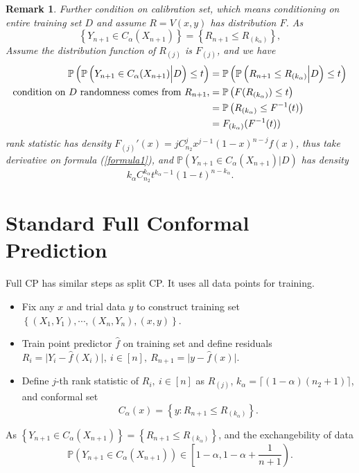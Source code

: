 \documentclass[12pt, a4paper, oneside]{article}
\newtheorem{remark}[theorem]{Remark}
\begin{document}
    \begin{remark}
        Further condition on calibration set, which means conditioning on entire training set $D$ and assume $R=V(x,y)$ has distribution $F$. As
        \begin{equation*}
            \left\{ Y_{n+1}\in C_\alpha(X_{n+1}) \right\}=\left\{ R_{n+1}\leq R_{(k_\alpha)} \right\},
        \end{equation*}
        Assume the distribution function of $R_{(j)}$ is $F_{(j)}$, and we have
        \begin{align}
            \mathbb{P}\left( \mathbb{P}\left( Y_{n+1}\in C_\alpha(X_{n+1})\Big|D \right)\leq t \right)&=\mathbb{P}\left( \mathbb{P}\left( R_{n+1}\leq R_{(k_\alpha)}\Big|D \right)\leq t \right)\notag\\
            \text{condition on $D$ randomness comes from $R_{n+1}$,}&=\mathbb{P}\left( F(R_{(k_\alpha)})\leq t \right)\notag\\
            &=\mathbb{P}\left( R_{(k_\alpha)}\leq F^{-1}(t) \right)\notag\\
            &=F_{(k_\alpha)}(F^{-1}(t))\label{formula1}
        \end{align}
        rank statistic has density $F_{(j)}'(x)=jC_{n_2}^jx^{j-1}(1-x)^{n-j}f(x)$, thus take derivative on formula (\ref{formula1}), and $\mathbb{P}\left( Y_{n+1}\in C_\alpha(X_{n+1})\Big|D \right)$ has density
        \begin{equation*}
            k_\alpha C_{n_2}^{k_\alpha}t^{k_\alpha-1}(1-t)^{n-k_\alpha}.
        \end{equation*}
    \end{remark}


\section{Standard Full Conformal Prediction}
    Full CP has similar steps as split CP. It uses all data points for training.
    \begin{itemize}
        \item Fix any $x$ and trial data $y$ to construct training set $\left\{ (X_1,Y_1),\cdots,(X_n,Y_n),(x,y) \right\}$.
        \item Train point predictor $\hat{f}$ on training set and define residuals $R_i=\Big|Y_i-\hat{f}(X_i)\Big|,\ i\in[n],\ R_{n+1}=\Big|y-\hat{f}(x)\Big|$.
        \item Define $j$-th rank statistic of $R_i,\ i\in[n]$ as $R_{(j)}$, $k_\alpha=\lceil (1-\alpha)(n_2+1)\rceil$, and conformal set
        \begin{equation*}
            C_\alpha(x)=\left\{ y:R_{n+1}\leq R_{(k_\alpha)} \right\}.
        \end{equation*}
    \end{itemize}
    As $\left\{ Y_{n+1}\in C_\alpha(X_{n+1}) \right\}=\left\{ R_{n+1}\leq R_{(k_\alpha)} \right\}$, and the exchangebility of data
    \begin{equation*}
        \mathbb{P}\left( Y_{n+1}\in C_\alpha(X_{n+1}) \right)\in\left[1-\alpha,1-\alpha+\dfrac{1}{n+1}\right).
    \end{equation*}
\end{document}
